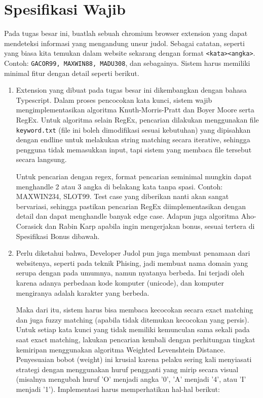 \section{Spesifikasi Wajib}
Pada tugas besar ini, buatlah sebuah chromium browser extension yang dapat mendeteksi informasi yang mengandung unsur judol. Sebagai catatan, seperti yang biasa kita temukan dalam website sekarang dengan format \texttt{<kata><angka>}. Contoh: \texttt{GACOR99, MAXWIN88, MADU308}, dan sebagainya. Sistem harus memiliki minimal fitur dengan detail seperti berikut.

\begin{enumerate}
    \item Extension yang dibuat pada tugas besar ini dikembangkan dengan bahasa Typescript. Dalam proses pencocokan kata kunci, sistem wajib mengimplementasikan algoritma Knuth-Morris-Pratt dan Boyer Moore serta RegEx. Untuk algoritma selain RegEx, pencarian dilakukan menggunakan file \texttt{keyword.txt} (file ini boleh dimodifikasi sesuai kebutuhan) yang dipisahkan dengan endline untuk melakukan string matching secara iterative, sehingga pengguna tidak memasukkan input, tapi sistem yang membaca file tersebut secara langsung.

          Untuk pencarian dengan regex, format pencarian seminimal mungkin dapat menghandle 2 atau 3 angka di belakang kata tanpa spasi. Contoh: MAXWIN234, SLOT99. Test case yang diberikan nanti akan sangat bervariasi, sehingga pastikan pencarian RegEx diimplementasikan dengan detail dan dapat menghandle banyak edge case. Adapun juga algoritma Aho-Corasick dan Rabin Karp apabila ingin mengerjakan bonus, sesuai tertera di Spesifikasi Bonus dibawah.

    \item Perlu diketahui bahwa, Developer Judol pun juga membuat penamaan dari websitenya, seperti pada teknik Phising, jadi membuat nama domain yang serupa dengan pada umumnya, namun nyatanya berbeda. Ini terjadi oleh karena adanya perbedaan kode komputer (unicode), dan komputer mengiranya adalah karakter yang berbeda.

          Maka dari itu, sistem harus bisa membaca kecocokan secara exact matching dan juga fuzzy matching (apabila tidak ditemukan kecocokan yang persis). Untuk setiap kata kunci yang tidak memiliki kemunculan sama sekali pada saat exact matching, lakukan pencarian kembali dengan perhitungan tingkat kemiripan menggunakan algoritma Weighted Levenshtein Distance. Penyesuaian bobot (weight) ini krusial karena pelaku sering kali menyiasati strategi dengan menggunakan huruf pengganti yang mirip secara visual (misalnya mengubah huruf 'O' menjadi angka '0', 'A' menjadi '4', atau 'I' menjadi '1'). Implementasi harus memperhatikan hal-hal berikut:


\end{enumerate}
